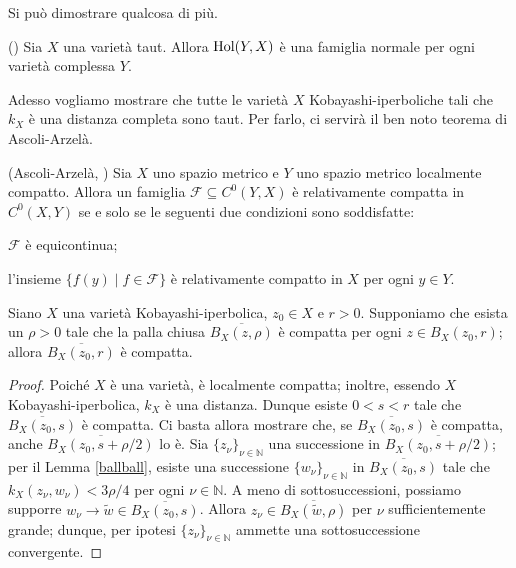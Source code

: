 Si può dimostrare qualcosa di più.

\begin{prop}
    (\cite[Theorem 2.1.2]{A1}) Sia $X$ una varietà taut. Allora $\textnormal{Hol}(Y,X)$ è una famiglia normale per ogni varietà complessa $Y$.
\end{prop}

Adesso vogliamo mostrare che tutte le varietà $X$ Kobayashi-iperboliche  tali che $k_X$ è una distanza completa sono taut. Per farlo, ci servirà il ben noto teorema di Ascoli-Arzelà.

\begin{thm}
    (Ascoli-Arzelà, \cite[Chapter 7, Theorem 17]{Ke}) Sia $X$ uno spazio metrico e $Y$ uno spazio metrico localmente compatto. Allora un famiglia $\mathcal{F}\subseteq C^0(Y,X)$ è relativamente compatta in $C^0(X,Y)$ se e solo se le seguenti due condizioni sono soddisfatte:
    \begin{nlist}
        \item $\mathcal{F}$ è equicontinua;
        \item l'insieme $\{f(y)\mid f\in\mathcal{F}\}$ è relativamente compatto in $X$ per ogni $y\in Y$.
    \end{nlist}
\end{thm}

\begin{lm} \label{errerhocpt}
    Siano $X$ una varietà Kobayashi-iperbolica, $z_0\in X$ e $r>0$. Supponiamo che esista un $\rho>0$ tale che la palla chiusa $\overline{B_X(z,\rho)}$ è compatta per ogni $z\in B_X(z_0,r)$; allora $\overline{B_X(z_0,r)}$ è compatta.
\end{lm}

\begin{proof}
    Poiché $X$ è una varietà, è localmente compatta; inoltre, essendo $X$ Kobayashi-iperbolica, $k_X$ è una distanza. Dunque esiste $0<s<r$ tale che $\overline{B_X(z_0,s)}$ è compatta. Ci basta allora mostrare che, se $\overline{B_X(z_0,s)}$ è compatta, anche $\overline{B_X(z_0,s+\rho/2)}$ lo è. Sia $\{z_\nu\}_{\nu\in\mathbb{N}}$ una successione in $\overline{B_X(z_0,s+\rho/2)}$; per il Lemma \ref{ballball}, esiste una successione $\{w_\nu\}_{\nu\in\mathbb{N}}$ in $\overline{B_X(z_0,s)}$ tale che $k_X(z_\nu,w_\nu)<3\rho/4$ per ogni $\nu\in\mathbb{N}$. A meno di sottosuccessioni, possiamo supporre $w_\nu\longrightarrow \tilde{w}\in\overline{B_X(z_0,s)}$. Allora $z_\nu\in\overline{B_X(\tilde{w},\rho)}$ per $\nu$ sufficientemente grande; dunque, per ipotesi $\{z_\nu\}_{\nu\in\mathbb{N}}$ ammette una sottosuccessione convergente.
\end{proof}

